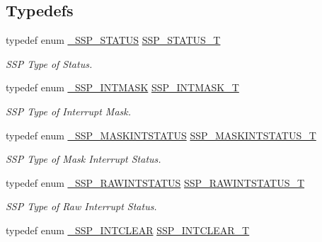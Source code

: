 \subsection*{Typedefs}
\begin{DoxyCompactItemize}
\item 
typedef enum \hyperlink{group___s_s_p__18_x_x__43_x_x_ga4ec33a0121a2ccab848c7b37907d9e9d}{\+\_\+\+S\+S\+P\+\_\+\+S\+T\+A\+T\+US} \hyperlink{group___s_s_p__18_x_x__43_x_x_gad95eaf4325a2ec8e457b309d21d6987d}{S\+S\+P\+\_\+\+S\+T\+A\+T\+U\+S\+\_\+T}
\begin{DoxyCompactList}\small\item\em S\+SP Type of Status. \end{DoxyCompactList}\item 
typedef enum \hyperlink{group___s_s_p__18_x_x__43_x_x_gab6a0ac593093184dd21c95f53b30f4ef}{\+\_\+\+S\+S\+P\+\_\+\+I\+N\+T\+M\+A\+SK} \hyperlink{group___s_s_p__18_x_x__43_x_x_ga84198f10a9a371b8523c09a850399bf4}{S\+S\+P\+\_\+\+I\+N\+T\+M\+A\+S\+K\+\_\+T}
\begin{DoxyCompactList}\small\item\em S\+SP Type of Interrupt Mask. \end{DoxyCompactList}\item 
typedef enum \hyperlink{group___s_s_p__18_x_x__43_x_x_gafaff4574b830e5b94dcaf7ca8da399e8}{\+\_\+\+S\+S\+P\+\_\+\+M\+A\+S\+K\+I\+N\+T\+S\+T\+A\+T\+US} \hyperlink{group___s_s_p__18_x_x__43_x_x_gac0b1a846ede1f57c5fa27d4163acdbe9}{S\+S\+P\+\_\+\+M\+A\+S\+K\+I\+N\+T\+S\+T\+A\+T\+U\+S\+\_\+T}
\begin{DoxyCompactList}\small\item\em S\+SP Type of Mask Interrupt Status. \end{DoxyCompactList}\item 
typedef enum \hyperlink{group___s_s_p__18_x_x__43_x_x_ga2042535e55396776c81a7235ed95db35}{\+\_\+\+S\+S\+P\+\_\+\+R\+A\+W\+I\+N\+T\+S\+T\+A\+T\+US} \hyperlink{group___s_s_p__18_x_x__43_x_x_gaf901cb9befcf9302650fed7f1ddba443}{S\+S\+P\+\_\+\+R\+A\+W\+I\+N\+T\+S\+T\+A\+T\+U\+S\+\_\+T}
\begin{DoxyCompactList}\small\item\em S\+SP Type of Raw Interrupt Status. \end{DoxyCompactList}\item 
typedef enum \hyperlink{group___s_s_p__18_x_x__43_x_x_ga59cc14c5381f32c16286c45bd6a3ece0}{\+\_\+\+S\+S\+P\+\_\+\+I\+N\+T\+C\+L\+E\+AR} \hyperlink{group___s_s_p__18_x_x__43_x_x_gadc98b69a8cb7a5afef8dd81bebbfc66d}{S\+S\+P\+\_\+\+I\+N\+T\+C\+L\+E\+A\+R\+\_\+T}

\end{DoxyCompactItemize}
